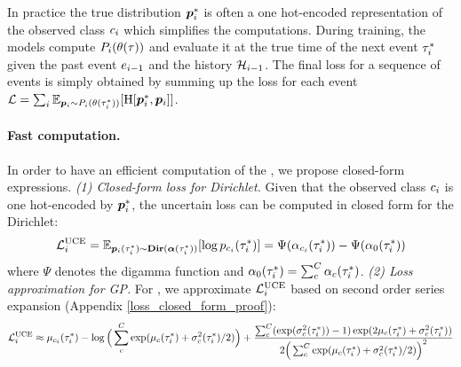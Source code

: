 In practice the true distribution $\bm{p}_{i}^*$ is often a one hot-encoded representation of the observed class $c_{i}$ which simplifies the computations. During training, the models compute $P_{i}(\theta(\tau))$ and evaluate it at the true time of the next event $\tau_{i}^*$ given the past event $e_{i-1}$ and the history $\mathcal{H}_{i-1}$. The final loss for a sequence of events is simply obtained by summing up the loss for each event
$\mathcal{L}=\sum_i \operatorname{\mathbb{E}}_{\bm{p}_{i} \sim P_{i}(\theta(\tau_{i}^*))}[\operatorname{H}[\bm{p}_{i}^*, \bm{p}_{i}]]$.

\paragraph{Fast computation.}  In order to have an efficient computation of the \UncertaintyLoss, we propose closed-form expressions.
\textit{(1) Closed-form loss for Dirichlet.} Given that the observed class $c_i$ is one hot-encoded by $\bm{p}_i^*$, the uncertain loss can be computed in closed form for the Dirichlet:
\begin{equation} \label{eq:dir_loss}
\mathcal{L}_i^{\text{UCE}} = \operatorname{\mathbb{E}}_{\bm{p}_i(\tau_i^*) \sim \textbf{Dir}(\bm{\alpha}(\tau_i^*))}[\log p_{c_i}(\tau_i^*)] = \Psi(\alpha_{c_i}(\tau_i^*)) - \Psi(\alpha_0(\tau_i^*))
\end{equation}
where $\Psi$ denotes the digamma function and $\alpha_0(\tau_i^*) = \sum_c^C \alpha_c(\tau_i^*)$.
\textit{(2) Loss approximation for GP.} For \GPModel, we approximate $ \mathcal{L}_i^{\text{UCE}}$ based on second order series expansion (Appendix \ref{loss_closed_form_proof}):
\small
\begin{equation} \label{eq:gp_loss}
    \mathcal{L}_i^{\text{UCE}}
    \approx \mu_{c_i}(\tau_i^*) - \log \Big( \sum_c^C \exp(\mu_c(\tau_i^*) + \sigma_c^2(\tau_i^*) / 2) \Big) +
        \frac{\sum_c^C (\exp(\sigma_c^2(\tau_i^*)) - 1) \exp(2 \mu_c(\tau_i^*) + \sigma_c^2(\tau_i^*))}
        {2 \Big( \sum_c^C \exp(\mu_c(\tau_i^*) + \sigma_c^2(\tau_i^*) / 2) \Big)^2}
\end{equation}
\normalsize


